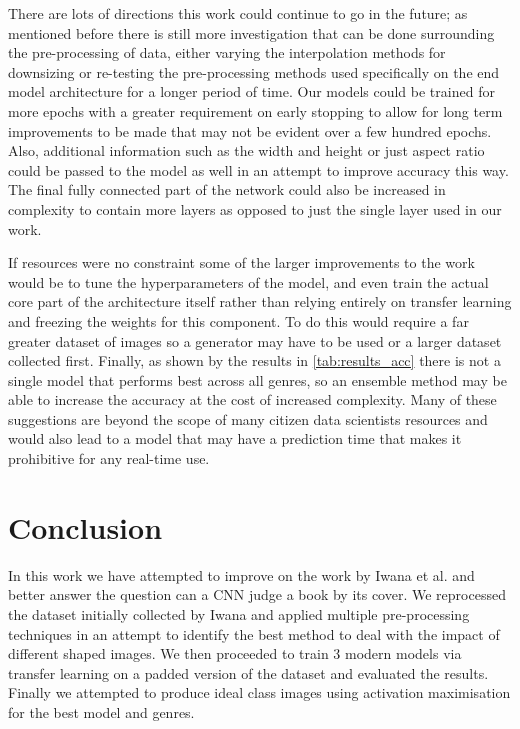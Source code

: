 \documentclass[12pt]{article}
\numberwithin{equation}{section}
\numberwithin{figure}{section}
\begin{document}
There are lots of directions this work could continue to go in the future; as mentioned before there is still more investigation that can be done surrounding the pre-processing of data, either varying the interpolation methods for downsizing or re-testing the pre-processing methods used specifically on the end model architecture for a longer period of time. Our models could be trained for more epochs with a greater requirement on early stopping to allow for long term improvements to be made that may not be evident over a few hundred epochs. Also, additional information such as the width and height or just aspect ratio could be passed to the model as well in an attempt to improve accuracy this way. The final fully connected part of the network could also be increased in complexity to contain more layers as opposed to just the single layer used in our work.

If resources were no constraint some of the larger improvements to the work would be to tune the hyperparameters of the model, and even train the actual core part of the architecture itself rather than relying entirely on transfer learning and freezing the weights for this component. To do this would require a far greater dataset of images so a generator may have to be used or a larger dataset collected first. Finally, as shown by the results in \cref{tab:results_acc} there is not a single model that performs best across all genres, so an ensemble method may be able to increase the accuracy at the cost of increased complexity. Many of these suggestions are beyond the scope of many citizen data scientists resources and would also lead to a model that may have a prediction time that makes it prohibitive for any real-time use.

\section{Conclusion} 
\label{sec:Conclusion} 
In this work we have attempted to improve on the work by Iwana et al. and better answer the question can a CNN judge a book by its cover. We reprocessed the dataset initially collected by Iwana and applied multiple pre-processing techniques in an attempt to identify the best method to deal with the impact of different shaped images. We then proceeded to train 3 modern models via transfer learning on a padded version of the dataset and evaluated the results. Finally we attempted to produce ideal class images using activation maximisation for the best model and genres.
\end{document}
